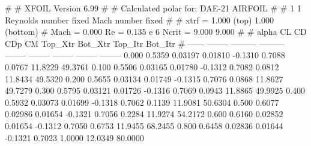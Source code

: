 #  
#       XFOIL         Version 6.99
#  
# Calculated polar for: DAE-21 AIRFOIL                                  
#  
# 1 1 Reynolds number fixed          Mach number fixed         
#  
# xtrf =   1.000 (top)        1.000 (bottom)  
# Mach =   0.000     Re =     0.135 e 6     Ncrit =   9.000  9.000
#  
#   alpha    CL        CD       CDp       CM     Top_Xtr  Bot_Xtr  Top_Itr  Bot_Itr
#  ------ -------- --------- --------- -------- -------- -------- -------- --------
   0.000   0.5359   0.03197   0.01810  -0.1310   0.7088   0.0767  11.8229  49.3761
   0.100   0.5506   0.03165   0.01780  -0.1312   0.7082   0.0812  11.8434  49.5320
   0.200   0.5655   0.03134   0.01749  -0.1315   0.7076   0.0868  11.8627  49.7279
   0.300   0.5795   0.03121   0.01726  -0.1316   0.7069   0.0943  11.8865  49.9925
   0.400   0.5932   0.03073   0.01699  -0.1318   0.7062   0.1139  11.9081  50.6304
   0.500   0.6077   0.02986   0.01654  -0.1321   0.7056   0.2284  11.9274  54.2172
   0.600   0.6160   0.02852   0.01654  -0.1312   0.7050   0.6753  11.9455  68.2455
   0.800   0.6458   0.02836   0.01644  -0.1321   0.7023   1.0000  12.0349  80.0000
